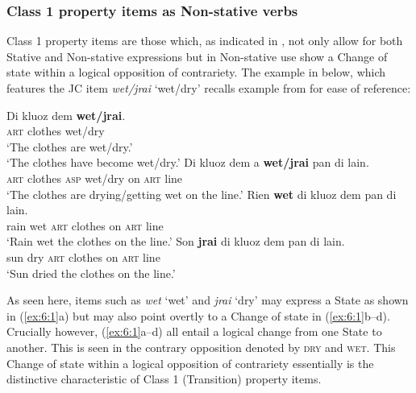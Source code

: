 \subsubsection{Class 1 property items as Non-stative verbs}\label{sec:6.1.1.1}

Class 1 property items are those which, as indicated in , not only allow for both Stative and Non-stative expressions but in Non-stative use show a Change of state within a logical opposition of contrariety. The example in  below, which features the JC item \textit{wet\slash jrai} ‘wet\slash dry’ recalls example  from  for ease of reference: 

\ea%
\label{ex:6:1}
 \ea
 \gll Di kluoz dem \textbf{wet/jrai}.\\
 \textsc{art} clothes {\PL} wet/dry\\
 \ea `The clothes are wet/dry.'\\
 \ex `The clothes have become wet/dry.'
 \z
 \ex
 \gll Di kluoz dem a \textbf{wet/jrai} pan di lain.\\
 \textsc{art} clothes {\PL} \textsc{asp} wet/dry on \textsc{art} line\\
 \glt `The clothes are drying\slash getting wet on the line.'
 \ex
 \gll Rien \textbf{wet} di kluoz dem pan di lain.\\
 rain wet \textsc{art} clothes {\PL} on \textsc{art} line\\
 \glt `Rain wet the clothes on the line.'
 \ex 
 \gll Son \textbf{jrai} di kluoz dem pan di lain.\\
 sun dry \textsc{art} clothes {\PL} on \textsc{art} line\\
 \glt `Sun dried the clothes on the line.'
 \z
\z


As seen here, items such as \textit{wet} `wet' and \textit{jrai} `dry' may express a State as shown in (\ref{ex:6:1}a) but may also point overtly to a Change of state in (\ref{ex:6:1}b--d). Crucially however, (\ref{ex:6:1}a--d) all entail a logical change from one State to another. This is seen in the contrary opposition denoted by \textsc{dry} and \textsc{wet}. This Change of state within a logical opposition of contrariety essentially is the distinctive characteristic of Class 1 (Transition) property items. 

